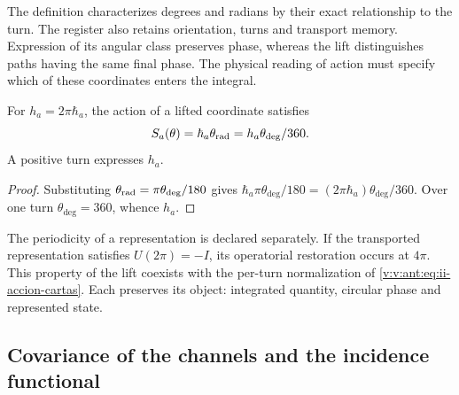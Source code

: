 The definition characterizes degrees and radians by their exact relationship to the turn. The register also retains orientation, turns and transport memory. Expression of its angular class preserves phase, whereas the lift distinguishes paths having the same final phase. The physical reading of action must specify which of these coordinates enters the integral.

\begin{proposition}
For \(h_a=2\pi\hbar_a\), the action of a lifted coordinate
satisfies
\begin{equation}
 \mathcal S_a(\theta)
 =\hbar_a\theta_{\rm rad}
 =h_a\frac{\theta_{\deg}}{360}.
 \label{v:v:ant:eq:ii-accion-cartas}
\end{equation}
A positive turn expresses \(h_a\).
\end{proposition}
\begin{proof}
Substituting \(\theta_{\rm rad}=\pi\theta_{\deg}/180\) gives \(\hbar_a\pi\theta_{\deg}/180
=(2\pi\hbar_a)\theta_{\deg}/360\). Over one turn \(\theta_{\deg}=360\), whence \(h_a\).
\end{proof}

The periodicity of a representation is declared separately. If the transported representation satisfies \(U(2\pi)=-I\), its operatorial restoration occurs at \(4\pi\). This property of the lift coexists with the per-turn normalization of \eqref{v:v:ant:eq:ii-accion-cartas}. Each preserves its object: integrated quantity, circular phase and represented state.

\subsection{Covariance of the channels and the incidence functional}

